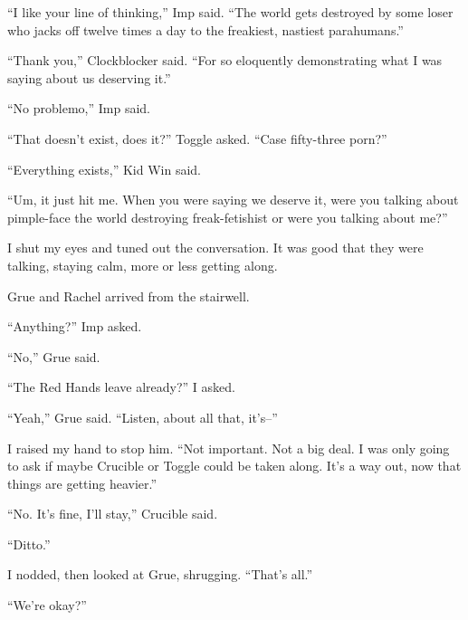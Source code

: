 ``I like your line of thinking,'' Imp said.  ``The world gets destroyed by some loser who jacks off twelve times a day to the freakiest, nastiest parahumans.''



``Thank you,'' Clockblocker said.  ``For so eloquently demonstrating what I was saying about us deserving it.''



``No problemo,'' Imp said.



``That doesn't exist, does it?''  Toggle asked.  ``Case fifty-three porn?''



``Everything exists,'' Kid Win said.



``Um, it just hit me.  When you were saying we deserve it, were you talking about pimple-face the world destroying freak-fetishist or were you talking about me?''



I shut my eyes and tuned out the conversation.  It was good that they were talking, staying calm, more or less getting along.



Grue and Rachel arrived from the stairwell.



``Anything?'' Imp asked.



``No,'' Grue said.



``The Red Hands leave already?'' I asked.



``Yeah,'' Grue said.  ``Listen, about all that, it's--''



I raised my hand to stop him.  ``Not important.  Not a big deal.  I was only going to ask if maybe Crucible or Toggle could be taken along.  It's a way out, now that things are getting heavier.''



``No.  It's fine, I'll stay,'' Crucible said.



``Ditto.''



I nodded, then looked at Grue, shrugging.  ``That's all.''



``We're okay?''



